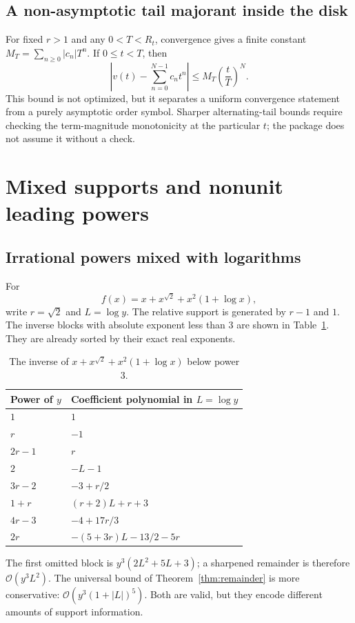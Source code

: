 \documentclass[11pt,a4paper]{article}
\numberwithin{equation}{section}
\theoremstyle{definition}
\theoremstyle{remark}
\newcommand{\OO}{\mathcal O}
\begin{document}
\subsection{A non-asymptotic tail majorant inside the disk}

For fixed $r>1$ and any $0<T<R_t$, convergence gives a finite constant
$M_T=\sum_{n\ge0}|c_n|T^n$. If $0\le t<T$, then
\[
 \left|v(t)-\sum_{n=0}^{N-1}c_nt^n\right|
 \le M_T\left(\frac tT\right)^N.
\]
This bound is not optimized, but it separates a uniform convergence
statement from a purely asymptotic order symbol. Sharper alternating-tail
bounds require checking the term-magnitude monotonicity at the particular
$t$; the package does not assume it without a check.

\section{Mixed supports and nonunit leading powers}
\label{sec:mixed}

\subsection{Irrational powers mixed with logarithms}

For
\[
 f(x)=x+x^{\sqrt2}+x^2(1+\log x),
\]
write $r=\sqrt2$ and $L=\log y$. The relative support is generated by
$r-1$ and $1$. The inverse blocks with absolute exponent less than $3$
are shown in Table~\ref{tab:mixed}. They are already sorted by their exact
real exponents.

\begin{table}[htbp]
\centering
\caption{The inverse of $x+x^{\sqrt2}+x^2(1+\log x)$ below power $3$.}
\label{tab:mixed}
\begin{tabular}{@{}ll@{}}
\toprule
Power of $y$ & Coefficient polynomial in $L=\log y$\\
\midrule
$1$ & $1$\\
$r$ & $-1$\\
$2r-1$ & $r$\\
$2$ & $-L-1$\\
$3r-2$ & $-3+r/2$\\
$1+r$ & $(r+2)L+r+3$\\
$4r-3$ & $-4+17r/3$\\
$2r$ & $-(5+3r)L-13/2-5r$\\
\bottomrule
\end{tabular}
\end{table}

The first omitted block is $y^3(2L^2+5L+3)$; a sharpened remainder is
therefore $\OO(y^3L^2)$. The universal bound of
Theorem~\ref{thm:remainder} is more conservative:
$\OO(y^3(1+|L|)^5)$. Both are valid, but they encode different amounts of
support information.
\end{document}
